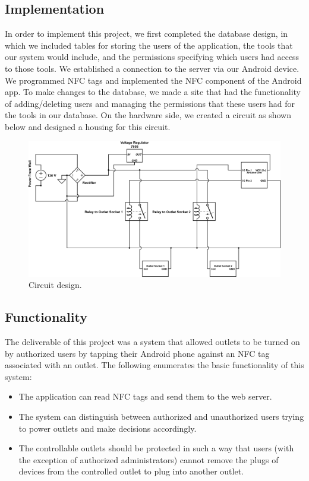 \documentclass{sigchi}
\begin{document}
\subsection{Implementation}
In order to implement this project, we first completed the database design, in which we included tables for storing the users of the application, the tools that our system would include, and the permissions specifying which users had access to those tools. 
We established a connection to the server via our Android device.
We programmed NFC tags and implemented the NFC component of the Android app.
To make changes to the database, we made a site that had the functionality of adding/deleting users and managing the permissions that these users had for the tools in our database.
On the hardware side, we created a circuit as shown below and designed a housing for this circuit.

\begin{figure}[!h]
\centering
\includegraphics[width=0.9\columnwidth]{circuit}
\caption{Circuit design.}
\label{fig:circuit}
\end{figure}

\subsection {Functionality}
The deliverable of this project was a system that allowed outlets to be turned on by authorized users by tapping their Android phone against an NFC tag associated with an outlet. The following enumerates the basic functionality of this system:
\begin{itemize}
\item The application can read NFC tags and send them to the web server.

\item The system can distinguish between authorized and unauthorized users trying to power outlets and make decisions accordingly. 

\item The controllable outlets should be protected in such a way that users (with the exception of authorized administrators) cannot remove the plugs of devices from the controlled outlet to plug into another outlet.
\end{itemize}
\end{document}
